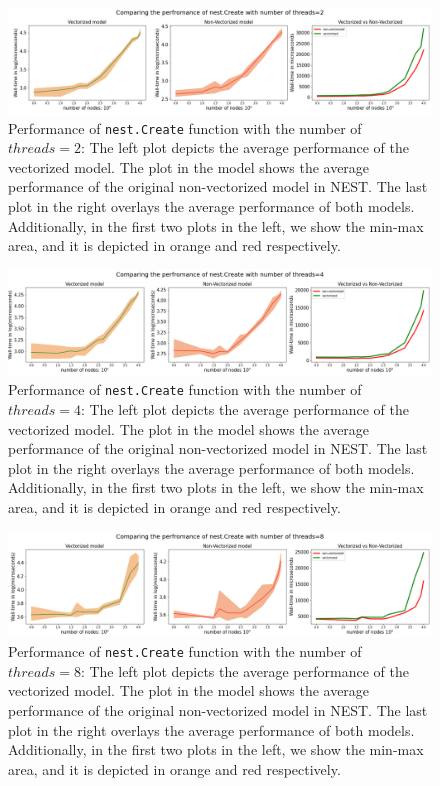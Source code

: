 \begin{figure}[ht!]
    \centering
    \includegraphics[width=\textwidth]{src/pic/thread_2.png}
    \caption{Performance of \texttt{nest.Create} function with the number of $threads=2$: The left plot depicts the average performance of the vectorized model. The plot in the model shows the average performance of the original non-vectorized model in NEST. The last plot in the right overlays the average performance of both models. Additionally, in the first two plots in the left, we show the min-max area, and it is depicted in orange and red respectively.}
    \label{fig:threads_2}
\end{figure}

\begin{figure}[ht!]
    \centering
    \includegraphics[width=\textwidth]{src/pic/thread_4.png}
    \caption{Performance of \texttt{nest.Create} function with the number of $threads=4$: The left plot depicts the average performance of the vectorized model. The plot in the model shows the average performance of the original non-vectorized model in NEST. The last plot in the right overlays the average performance of both models. Additionally, in the first two plots in the left, we show the min-max area, and it is depicted in orange and red respectively.}
    \label{fig:threads_4}
\end{figure}

\begin{figure}[ht!]
    \centering
    \includegraphics[width=\textwidth]{src/pic/thread_8.png}
    \caption{Performance of \texttt{nest.Create} function with the number of $threads=8$: The left plot depicts the average performance of the vectorized model. The plot in the model shows the average performance of the original non-vectorized model in NEST. The last plot in the right overlays the average performance of both models. Additionally, in the first two plots in the left, we show the min-max area, and it is depicted in orange and red respectively.}
    \label{fig:threads_8}
\end{figure}


